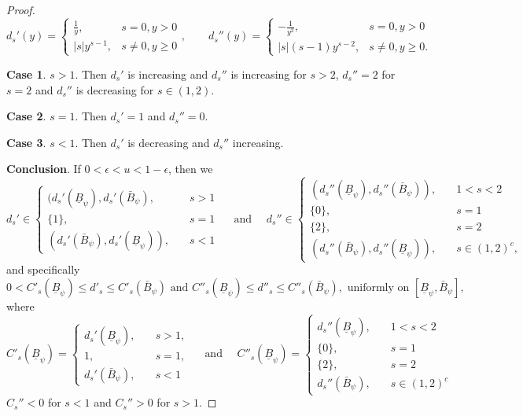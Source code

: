 \documentclass{article} %
\begin{document}
\begin{proof}
$$
d_s'(y)= \begin{cases}\frac{1}{y}, & s=0, y>0 \\ |s|y^{s-1}, & s\neq0, y\geq 0\end{cases}, \qquad d_s''(y)= \begin{cases}-\frac{1}{y^2}, & s=0, y>0 \\ |s|(s-1)y^{s-2}, & s\neq0, y\geq 0.\end{cases}
$$

\textbf{Case 1}. $s>1$. Then $d_s'$ is increasing and $d_s''$ is increasing for $s>2$,  $d_s''=2$ for $s=2$ and $d_s''$ is decreasing for $s\in (1,2)$.

\textbf{Case 2}. $s=1$. Then $d_s'=1$ and $d_s''=0$.

\textbf{Case 3}. $s < 1$. Then $d_s'$ is decreasing and $d_s''$ increasing. 

\textbf{Conclusion}. If $0<\epsilon < u < 1-\epsilon$, then we
$$
d_{s}'\in
\begin{cases}
    (d_{s}'(\underline{B}_{\psi}),d_{s}'(\bar{B}_{\psi}),\quad & s > 1\\
    \{1\},\quad & s = 1\\
    (d_{s}'(\bar{B}_{\psi}),d_{s}'(\underline{B}_{\psi})),\quad & s < 1
\end{cases}
\quad \text{ and } \quad
d_{s}''\in
\begin{cases}
    (d_{s}''(\underline{B}_{\psi}),d_{s}''(\bar{B}_{\psi})),\quad & 1< s < 2\\
    \{0\},\quad & s = 1\\
    \{2\},\quad & s = 2\\
    (d_{s}''(\bar{B}_{\psi}),d_{s}''(\underline{B}_{\psi})),\quad & s \in (1,2)^c,
\end{cases}
$$
and specifically
$$
0< C'_{s}(\underline{B}_{\psi}) \leq d'_{s} \leq C'_{s}(\bar{B}_{\psi}) \text{ and } C''_{s}(\underline{B}_{\psi}) \leq d''_{s} \leq C''_{s}(\bar{B}_{\psi}), \text{ uniformly on }[\underline{B}_{\psi}, \bar{B}_{\psi}],
$$
where 
$$
C'_{s}(\underline{B}_{\psi})=
\begin{cases}
    d_{s}'(\underline{B}_{\psi}), \quad &s >1,\\
    1, \quad &s =1,\\
    d_{s}'(\bar{B}_{\psi}), \quad &s <1
\end{cases}
\quad \text{ and } \quad 
C''_{s}(\underline{B}_{\psi}) = 
\begin{cases}
    d_{s}''(\underline{B}_{\psi}),\quad & 1< s < 2\\
    \{0\},\quad & s = 1\\
    \{2\},\quad & s = 2\\
    d_{s}''(\bar{B}_{\psi}),\quad & s \in (1,2)^c
\end{cases}
$$
$C_s''< 0$ for $s<1$ and $C_s''>0$ for $s> 1$.
\end{proof}
\end{document}
